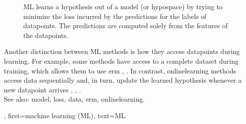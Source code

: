 {{\begin{figure}[H]
			\vspace*{-9mm}
		\caption{ML learns a \gls{hypothesis} out of a \gls{model} (or \gls{hypospace}) 
			by trying to minimize the \gls{loss} incurred by the \glspl{prediction} 
			for the \glspl{label} of \glspl{datapoint}. The \glspl{prediction} are 
			computed solely from the \glspl{feature} of the \glspl{datapoint}.}
			\label{fig_AlexMLBP_dict}
		\end{figure}
		Another distinction between ML methods is how they access \glspl{datapoint} during 
		learning. For example, some methods have access to a complete \gls{dataset} 
		during \gls{training}, which allows them to use \gls{erm} \cite{MLBasics}, \cite{HastieWainwrightBook}. 
		In contrast, \gls{onlinelearning} methods access \gls{data} 
		sequentially and, in turn, update the learned \gls{hypothesis} 
		whenever a new \gls{datapoint} arrives \cite{PredictionLearningGames}, \cite{HazanOCO}, \cite{Bottou99}.
	 			\\ 
		See also: \gls{model}, \gls{loss}, \gls{data}, \gls{erm}, \gls{onlinelearning}.},
	first={machine learning (ML)},
	text={ML}
}

